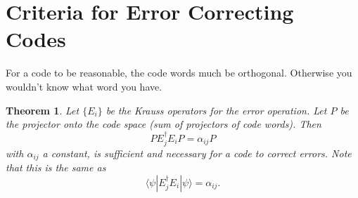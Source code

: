 \documentclass[12pt]{article}
\newtheorem{theorem}{Theorem}[section]
\begin{document}
\section{Criteria for Error Correcting Codes}

For a code to be reasonable, the code words much be orthogonal. Otherwise you wouldn't know what word you have.

\begin{theorem}
Let $\{E_i\}$ be the Krauss operators for the error operation. Let $P$ be the projector onto the code space (sum of projectors of code words). Then 
\begin{equation}
PE_j^\dagger E_iP=\alpha_{ij}P
\end{equation}
with $\alpha_{ij}$ a constant, is sufficient and necessary for a code to correct errors. Note that this is the same as 
$$ \langle\psi|E_j^\dagger E_i|\psi\rangle=\alpha_{ij}.$$

\end{theorem}
\end{document}
